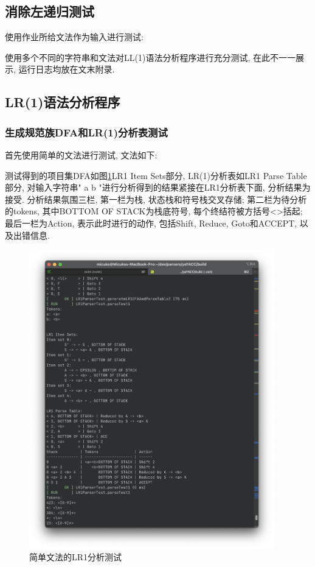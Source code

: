 \subsection{消除左递归测试}
使用作业所给文法作为输入进行测试:


使用多个不同的字符串和文法对LL(1)语法分析程序进行充分测试, 在此不一一展示,
运行日志均放在文末附录.

\subsection{LR(1)语法分析程序}
\subsubsection{生成规范族DFA和LR(1)分析表测试}

首先使用简单的文法进行测试, 文法如下:


测试得到的项目集DFA如图\ref{fig:简单文法的LR1分析测试}LR1 Item Sets部分,
LR(1)分析表如LR1 Parse Table部分,
对输入字符串"  a  b  "进行分析得到的结果紧接在LR1分析表下面, 分析结果为接受.
分析结果氛围三栏, 第一栏为栈, 状态栈和符号栈交叉存储; 第二栏为待分析的tokens,
其中BOTTOM OF STACK为栈底符号, 每个终结符被方括号<>括起; 最后一栏为Action,
表示此时进行的动作, 包括Shift, Reduce, Goto和ACCEPT, 以及出错信息.

\begin{figure}[ht!]
	\begin{center}
		\includegraphics[width=0.95\textwidth]{figures/lr1分析1.png}
	\end{center}
	\caption{简单文法的LR1分析测试}
	\label{fig:简单文法的LR1分析测试}
\end{figure}


